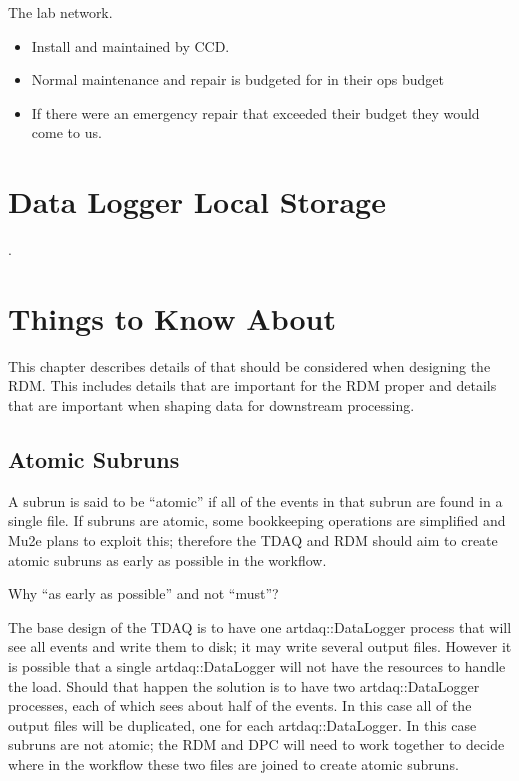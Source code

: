 The lab network.
\begin{itemize}
\item Install and maintained by CCD.
\item Normal maintenance and repair is budgeted for in their ops budget
\item If there were an emergency repair that exceeded their budget they would come to us. 
\end{itemize}

\chapter{Data Logger Local Storage}
\label{app:DataLoggerLocalStorage}

.

\chapter{Things to Know About \art}

This chapter describes details of \art that should be considered when
designing the RDM.  This includes details that are important for the RDM
proper and details that are important when shaping data for downstream
processing.

\section{Atomic Subruns}
\label{sec:AtomicSubruns}

A subrun is said to be ``atomic'' if all of the events in that subrun are found in a single \art file.
If subruns are atomic, some bookkeeping operations are simplified and Mu2e plans to exploit this;
therefore the TDAQ and RDM should aim to create atomic subruns as early as possible in the workflow.

Why ``as early as possible'' and not ``must''?

The base design of the TDAQ is to have one {\code artdaq::DataLogger} process that will
see all events and write them to disk; it may write several output files.
However it is possible that a single {\code artdaq::DataLogger} will not have the
resources to handle the load.  Should that happen the solution is to have two
{\code artdaq::DataLogger} processes, each of which sees about half of the events.
In this case all of the output files will be duplicated,
one for each {\code artdaq::DataLogger}.
In this case subruns are not atomic;
the RDM and DPC will need to work together to decide where in the workflow these two files
are joined to create atomic subruns.

